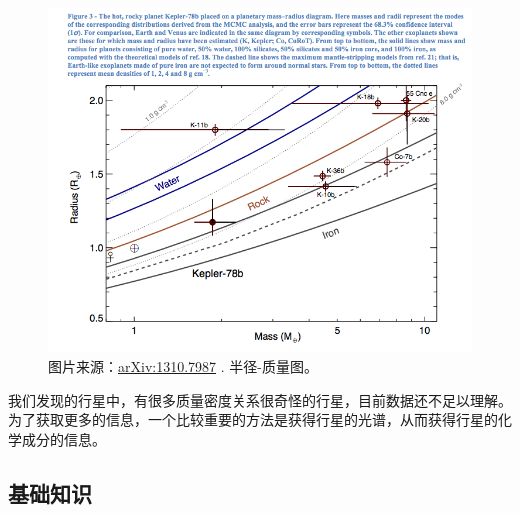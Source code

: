 \documentclass[letterpaper,10pt,english]{sphinxmanual}
\begin{document}
\begin{figure}[htbp]
\centering
\capstart

\includegraphics{radiusVSMass.png}
\caption{图片来源：\href{http://arxiv.org/abs/1310.7987}{arXiv:1310.7987} . 半径-质量图。}\end{figure}

我们发现的行星中，有很多质量密度关系很奇怪的行星，目前数据还不足以理解。为了获取更多的信息，一个比较重要的方法是获得行星的光谱，从而获得行星的化学成分的信息。


\subsection{基础知识}
\label{atmosphere:id2}
\end{document}
